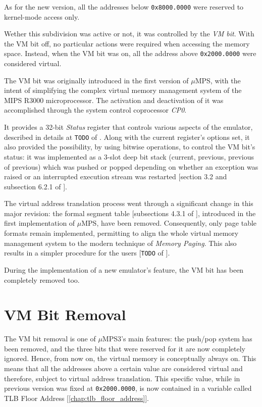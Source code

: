 \documentclass[12pt,a4paper,openright,twoside]{report}
\begin{document}
As for the new version, all the addresses below \texttt{0x8000.0000} were reserved to kernel-mode access only.

Wether this subdivision was active or not, it was controlled by the \textit{VM bit}.
With the VM bit off, no particular actions were required when accessing the memory space.
Instead, when the VM bit was on, all the address above \texttt{0x2000.0000} were considered virtual.

The VM bit was originally introduced in the first version of $\mu$MPS, with the intent of simplifying the complex virtual memory management system of the MIPS R3000 microprocessor.
The activation and deactivation of it was accomplished through the system control coprocessor \textit{CP0}.

It provides a 32-bit \textit{Status} register that controls various aspects of the emulator, described in details at \texttt{TODO} of \cite{pops}.
Along with the current register's options set, it also provided the possibility, by using bitwise operations, to control the VM bit's status: it was implemented as a 3-slot deep bit stack (current, previous, previous of previous) which was pushed or popped depending on whether an exception was raised or an interrupted execution stream was restarted [section 3.2 and subsection 6.2.1 of \cite{old_pops}].

The virtual address translation process went through a significant change in this major revision: the formal segment table [subsections 4.3.1 of \cite{old_pops}], introduced in the first implementation of $\mu$MPS, have been removed.
Consequently, only page table formats remain implemented, permitting to align the whole virtual memory management system to the modern technique of \textit{Memory Paging}.
This also results in a simpler procedure for the users [\texttt{TODO} of \cite{pops}].

During the implementation of a new emulator's feature, the VM bit has been completely removed too.

\section{VM Bit Removal}
\label{chap:vm_bit_removal}
The VM bit removal is one of $\mu$MPS3's main features: the push/pop system has been removed, and the three bits that were reserved for it are now completely ignored.
Hence, from now on, the virtual memory is conceptually always on.
This means that all the addresses above a certain value are considered virtual and therefore, subject to virtual address translation.
This specific value, while in previous version was fixed at \texttt{0x2000.0000}, is now contained in a variable called TLB Floor Address [\autoref{chap:tlb_floor_address}].
\end{document}
